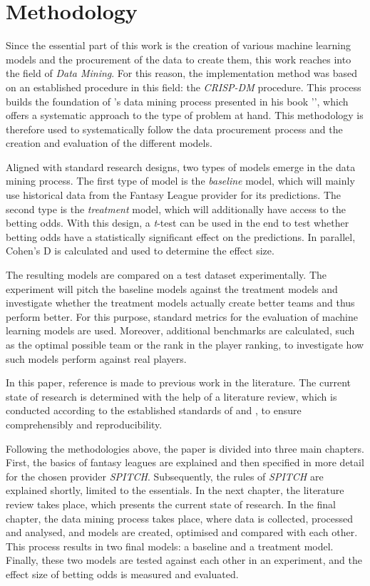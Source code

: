 \clearpage \section{Methodology}

Since the essential part of this work is the creation of various machine learning models and the procurement of the data to create them, this work reaches into the field of \emph{Data Mining}. For this reason, the implementation method was based on an established procedure in this field: the \emph{CRISP-DM} \parencite{chapman_crisp-dm_2000} procedure. This process builds the foundation of \citeauthor[]{geron_hands-machine_2019}'s data mining process presented in his book '', which offers a systematic approach to the type of problem at hand. This methodology is therefore used to systematically follow the data procurement process and the creation and evaluation of the different models.

Aligned with standard research designs, two types of models emerge in the data mining process. The first type of model is the \emph{baseline} model, which will mainly use historical data from the Fantasy League provider for its predictions. The second type is the \emph{treatment} model, which will additionally have access to the betting odds. With this design, a \emph{t}-test can be used in the end to test whether betting odds have a statistically significant effect on the predictions. In parallel, Cohen's D is calculated and used to determine the effect size.

The resulting models are compared on a test dataset experimentally. The experiment will pitch the baseline models against the treatment models and investigate whether the treatment models actually create better teams and thus perform better. For this purpose, standard metrics for the evaluation of machine learning models are used. Moreover, additional benchmarks are calculated, such as the optimal possible team or the rank in the player ranking, to investigate how such models perform against real players.

\clearpage In this paper, reference is made to previous work in the literature. The current state of research is determined with the help of a literature review, which is conducted according to the established standards of \citeauthor[]{webster_guest_2002} and \citeauthor[]{vom_brocke_standing_2015}, to ensure comprehensibly and reproducibility.

Following the methodologies above, the paper is divided into three main chapters. First, the basics of fantasy leagues are explained and then specified in more detail for the chosen provider \emph{SPITCH}. Subsequently, the rules of \emph{SPITCH} are explained shortly, limited to the essentials. In the next chapter, the literature review takes place, which presents the current state of research. In the final chapter, the data mining process takes place, where data is collected, processed and analysed, and models are created, optimised and compared with each other. This process results in two final models: a baseline and a treatment model. Finally, these two models are tested against each other in an experiment, and the effect size of betting odds is measured and evaluated.
